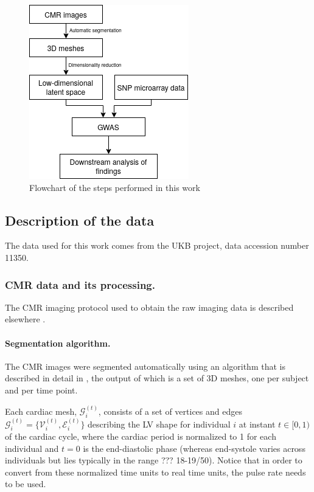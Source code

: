 \documentclass[twocolumn]{llncs}
\newcommand{\ACCESSIONNUMBER}{11350}
\begin{document}
\begin{figure}
\centering
\includegraphics[width=0.8\linewidth]{figs/workflow.png} 
\caption{Flowchart of the steps performed in this work}
\label{fig_workflow}
\end{figure}

\subsection{Description of the data}
The data used for this work comes from the UKB project, data accession number \ACCESSIONNUMBER.

\subsubsection{CMR data and its processing.}
The CMR imaging protocol used to obtain the raw imaging data is described elsewhere \cite{ref_ukbb_cmr}. 

\paragraph{Segmentation algorithm.}
The CMR images were segmented automatically using an algorithm that is described in detail in \cite{ref_rahman}, the output of which is a set of 3D meshes, one per subject and per time point. 

Each cardiac mesh, $\mathcal{G}_{i}^{(t)}$, consists of a set of vertices and edges $\mathcal{G}_{i}^{(t)}=\{\mathcal{V}_{i}^{(t)}, \mathcal{E}_{i}^{(t)}\}$ describing the LV shape for individual $i$ at instant $t\in[0,1)$ of the cardiac cycle, where the cardiac period is normalized to 1 for each individual and $t=0$ is the end-diastolic phase (whereas end-systole varies across individuals but lies typically in the range ??? 18-19/50). Notice that in order to convert from these normalized time units to real time units, the pulse rate needs to be used.
\end{document}
